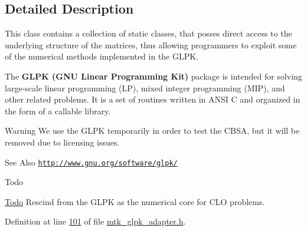 \subsection{Detailed Description}
This class contains a collection of static classes, that posses direct access to the underlying structure of the matrices, thus allowing programmers to exploit some of the numerical methods implemented in the G\-L\-P\-K.

The {\bfseries G\-L\-P\-K (G\-N\-U Linear Programming Kit)} package is intended for solving large-\/scale linear programming (L\-P), mixed integer programming (M\-I\-P), and other related problems. It is a set of routines written in A\-N\-S\-I C and organized in the form of a callable library.

\begin{DoxyWarning}{Warning}
We use the G\-L\-P\-K temporarily in order to test the C\-B\-S\-A, but it will be removed due to licensing issues.
\end{DoxyWarning}
\begin{DoxySeeAlso}{See Also}
\href{http://www.gnu.org/software/glpk/}{\tt http\-://www.\-gnu.\-org/software/glpk/}
\end{DoxySeeAlso}
\begin{DoxyRefDesc}{Todo}
\item[\hyperlink{todo__todo000004}{Todo}]Rescind from the G\-L\-P\-K as the numerical core for C\-L\-O problems. \end{DoxyRefDesc}


Definition at line \hyperlink{mtk__glpk__adapter_8h_source_l00101}{101} of file \hyperlink{mtk__glpk__adapter_8h_source}{mtk\-\_\-glpk\-\_\-adapter.\-h}.



